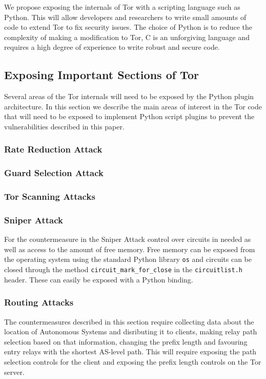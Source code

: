\documentclass[9pt,technote]{IEEEtran}
\begin{document}
We propose exposing the internals of Tor with a scripting language such as
Python. This will allow developers and researchers to write small amounts of
code to extend Tor to fix security issues. The choice of Python is to reduce the
complexity of making a modification to Tor, C is an unforgiving language and
requires a high degree of experience to write robust and secure code.

\subsection{Exposing Important Sections of Tor}
Several areas of the Tor internals will need to be exposed by the Python plugin
architecture. In this section we describe the main areas of interest in the Tor
code that will need to be exposed to implement Python script plugins to prevent
the vulnerabilities described in this paper.
\subsubsection{Rate Reduction Attack}
\subsubsection{Guard Selection Attack}
\subsubsection{Tor Scanning Attacks}
\subsubsection{Sniper Attack}
For the countermeasure in the Sniper Attack control over circuits in needed as
well as access to the amount of free memory. Free memory can be exposed from the
operating system using the standard Python library \texttt{os} and circuits can
be closed through the method \texttt{circuit\_mark\_for\_close} in the
\texttt{circuitlist.h} header. These can easily be exposed with a Python
binding.
\subsubsection{Routing Attacks}
The countermeasures described in this section require collecting data about the
location of Autonomous Systems and disributing it to clients, making relay path
selection based on that information, changing the prefix length and favouring
entry relays with the shortest AS-level path. This will require exposing the
path selection controls for the client and exposing the prefix length controls
on the Tor server.
\end{document}
